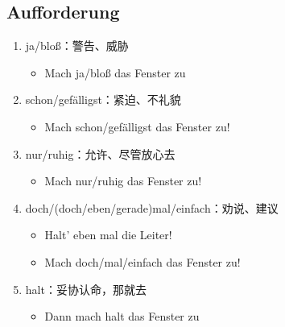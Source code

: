 \documentclass[UTF8]{report}
\begin{document}
\subsection{Aufforderung}
\begin{enumerate}
    \item ja/bloß：警告、威胁
    \begin{itemize}
        \item Mach ja/bloß das Fenster zu
    \end{itemize}
    \item schon/gefälligst：紧迫、不礼貌
    \begin{itemize}
        \item Mach schon/gefälligst das Fenster zu!
    \end{itemize}
    \item nur/ruhig：允许、尽管放心去
    \begin{itemize}
        \item Mach nur/ruhig das Fenster zu! 
    \end{itemize}
    \item doch/(doch/eben/gerade)mal/einfach：劝说、建议
    \begin{itemize}
        \item Halt’ eben mal die Leiter!
        \item Mach doch/mal/einfach das Fenster zu!
    \end{itemize}
    \item halt：妥协认命，那就去
    \begin{itemize}
        \item Dann mach halt das Fenster zu
    \end{itemize}
\end{enumerate}
\end{document}

